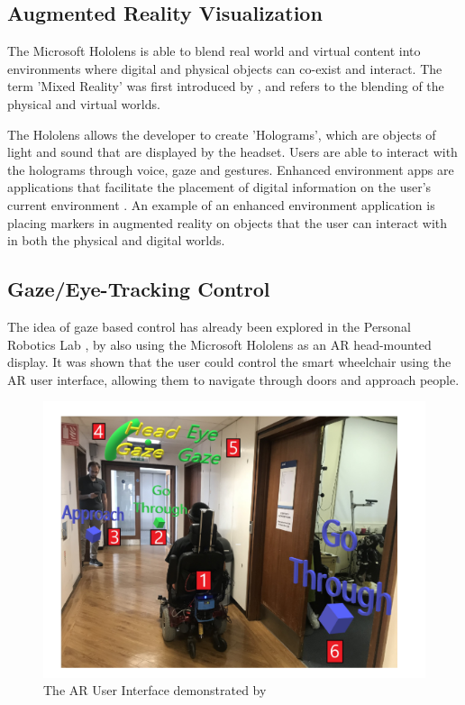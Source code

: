 \documentclass[12pt,a4paper]{report}
\begin{document}
\subsection{Augmented Reality Visualization}
The Microsoft Hololens is able to blend real world and virtual content into environments where digital and physical objects can co-exist and interact. The term 'Mixed Reality' was first introduced by \cite{Milgram1994}, and refers to the blending of the physical and virtual worlds.

The Hololens allows the developer to create 'Holograms', which are objects of light and sound that are displayed by the headset. Users are able to interact with the holograms through voice, gaze and gestures. Enhanced environment apps are applications that facilitate the placement of digital information on the user's current environment \citep{Microsofta}. An example of an enhanced environment application is placing markers in augmented reality on objects that the user can interact with in both the physical and digital worlds. 


\subsection{Gaze/Eye-Tracking Control}
The idea of gaze based control has already been explored in the Personal Robotics Lab \citep{Chacon-Quesada}, by also using the Microsoft Hololens as an AR head-mounted display. It was shown that the user could control the smart wheelchair using the AR user interface, allowing them to navigate through doors and approach people.

\begin{figure}[h!]
	\begin{center}
		\includegraphics[scale=0.4]{Images/Literature/AR_Interface.png}
		\caption{The AR User Interface demonstrated by  \cite{Chacon-Quesada}}
		\label{fig:Chacon_AR}
		
	\end{center}
	
\end{figure}
\end{document}
